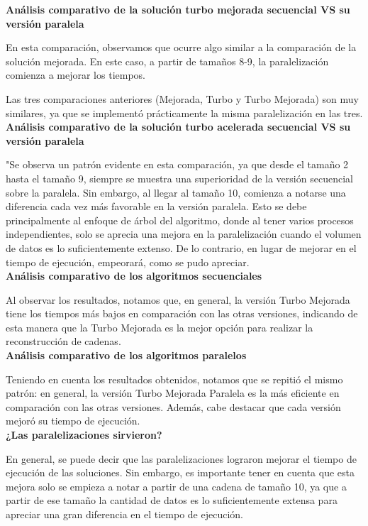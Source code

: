 \documentclass[conference]{IEEEtran}
\begin{document}
\textbf{Análisis comparativo de la solución turbo mejorada secuencial VS su versión paralela}

En esta comparación, observamos que ocurre algo similar a la comparación de la solución mejorada. En este caso, a partir de tamaños 8-9, la paralelización comienza a mejorar los tiempos.

Las tres comparaciones anteriores (Mejorada, Turbo y Turbo Mejorada) son muy similares, ya que se implementó prácticamente la misma paralelización en las tres.\\

\textbf{Análisis comparativo de la solución turbo acelerada secuencial VS su versión paralela}

"Se observa un patrón evidente en esta comparación, ya que desde el tamaño 2 hasta el tamaño 9, siempre se muestra una superioridad de la versión secuencial sobre la paralela. Sin embargo, al llegar al tamaño 10, comienza a notarse una diferencia cada vez más favorable en la versión paralela. Esto se debe principalmente al enfoque de árbol del algoritmo, donde al tener varios procesos independientes, solo se aprecia una mejora en la paralelización cuando el volumen de datos es lo suficientemente extenso. De lo contrario, en lugar de mejorar en el tiempo de ejecución, empeorará, como se pudo apreciar.\\

\textbf{Análisis comparativo de los algoritmos secuenciales}

Al observar los resultados, notamos que, en general, la versión Turbo Mejorada tiene los tiempos más bajos en comparación con las otras versiones, indicando de esta manera que la Turbo Mejorada es la mejor opción para realizar la reconstrucción de cadenas.\\
\newpage
\textbf{Análisis comparativo de los algoritmos paralelos}

Teniendo en cuenta los resultados obtenidos, notamos que se repitió el mismo patrón: en general, la versión Turbo Mejorada Paralela es la más eficiente en comparación con las otras versiones. Además, cabe destacar que cada versión mejoró su tiempo de ejecución.\\

\textbf{¿Las paralelizaciones sirvieron?}

En general, se puede decir que las paralelizaciones lograron mejorar el tiempo de ejecución de las soluciones. Sin embargo, es importante tener en cuenta que esta mejora solo se empieza a notar a partir de una cadena de tamaño 10, ya que a partir de ese tamaño la cantidad de datos es lo suficientemente extensa para apreciar una gran diferencia en el tiempo de ejecución.
\end{document}
